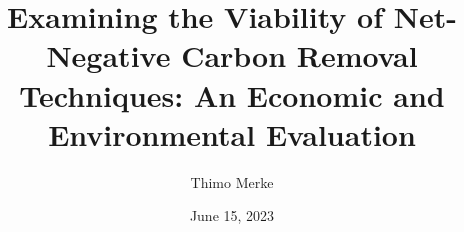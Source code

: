 \documentclass[12pt]{report}
\title{Examining the Viability of Net-Negative Carbon Removal Techniques: An Economic and Environmental Evaluation}
\author{Thimo Merke}
\date{June 15, 2023}
\begin{document}
\renewcommand{\thepage}{\roman{page}}





\tableofcontents
\listoffigures
\listoftables
\newpage

\makenomenclature

\printnomenclature
\newpage

\setcounter{page}{1}
\renewcommand{\thepage}{\arabic{page}}
%






\appendix


\printbibliography


\end{document}
